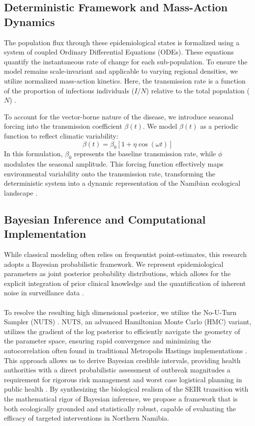 \documentclass[12pt,a4paper]{report} %
\begin{document}
\subsection{Deterministic Framework and Mass-Action Dynamics}
The population flux through these epidemiological states is formalized using a system of coupled Ordinary Differential Equations (ODEs). These equations quantify the instantaneous rate of change for each sub-population. To ensure the model remains scale-invariant and applicable to varying regional densities, we utilize normalized mass-action kinetics. Here, the transmission rate is a function of the proportion of infectious individuals ($I/N$) relative to the total population ($N$) \cite{11, 12}.

To account for the vector-borne nature of the disease, we introduce seasonal forcing into the transmission coefficient $\beta(t)$. We model $\beta(t)$ as a periodic function to reflect climatic variability:
\begin{equation}
    \beta(t) = \beta_0 [1 + \eta \cos(\omega t)]
\end{equation}
In this formulation, $\beta_0$ represents the baseline transmission rate, while $\phi$ modulates the seasonal amplitude. This forcing function effectively maps environmental variability onto the transmission rate, transforming the deterministic system into a dynamic representation of the Namibian ecological landscape \cite{6, 9}.
\subsection{Bayesian Inference and Computational Implementation}
While classical modeling often relies on frequentist point-estimates, this research adopts a Bayesian probabilistic framework. We represent epidemiological parameters as joint posterior probability distributions, which allows for the explicit integration of prior clinical knowledge and the quantification of inherent noise in surveillance data \cite{6, 17}.\\\\
To resolve the resulting high dimensional posterior, we utilize the No-U-Turn Sampler (NUTS) \cite{5}. NUTS, an advanced Hamiltonian Monte Carlo (HMC) variant, utilizes the gradient of the log posterior to efficiently navigate the geometry of the parameter space, ensuring rapid convergence and minimizing the autocorrelation often found in traditional Metropolis Hastings implementations \cite{2, 18}. This approach allows us to derive Bayesian credible intervals, providing health authorities with a direct probabilistic assessment of outbreak magnitudes a requirement for rigorous risk management and worst case logistical planning in public health \cite{6, 10}. By synthesizing the biological realism of the SEIR transition with the mathematical rigor of Bayesian inference, we propose a framework that is both ecologically grounded and statistically robust, capable of evaluating the efficacy of targeted interventions in Northern Namibia.
\end{document}
